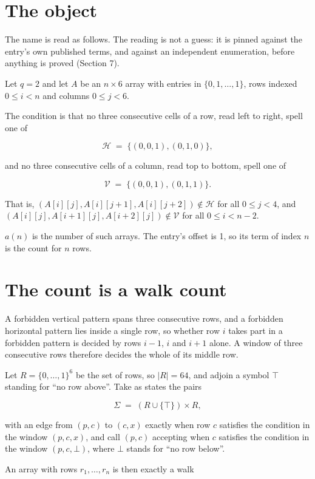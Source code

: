 \documentclass[11pt]{article}
\theoremstyle{definition}
\begin{document}
\section{The object}

The name is read as follows. The reading is not a guess: it is pinned against the entry's own published terms, and against an independent enumeration, before anything is proved (Section 7).

Let $q = 2$ and let $A$ be an $n \times 6$ array with entries in $\{0,1,\dots,1\}$, rows indexed $0 \le i < n$ and columns $0 \le j < 6$.

The condition is that no three consecutive cells of a row, read left to right, spell one of

\[\mathcal{H} \;=\; \{(0,0,1), (0,1,0)\},\]

and no three consecutive cells of a column, read top to bottom, spell one of

\[\mathcal{V} \;=\; \{(0,0,1), (0,1,1)\}.\]

That is, $(A[i][j],A[i][j{+}1],A[i][j{+}2]) \notin \mathcal{H}$ for all $0 \le j < 4$, and $(A[i][j],A[i{+}1][j],A[i{+}2][j]) \notin \mathcal{V}$ for all $0 \le i < n-2$.

$a(n)$ is the number of such arrays. The entry's offset is 1, so its term of index $n$ is the count for $n$ rows.

\section{The count is a walk count}

A forbidden vertical pattern spans three consecutive rows, and a forbidden horizontal pattern lies inside a single row, so whether row $i$ takes part in a forbidden pattern is decided by rows $i-1$, $i$ and $i+1$ alone. A window of three consecutive rows therefore decides the whole of its middle row.

Let $R = \{0,\dots,1\}^{6}$ be the set of rows, so $|R| = 64$, and adjoin a symbol $\top$ standing for ``no row above''. Take as states the pairs

\[\Sigma \;=\; (R \cup \{\top\}) \times R,\]

with an edge from $(p,c)$ to $(c,x)$ exactly when row $c$ satisfies the condition in the window $(p,c,x)$, and call $(p,c)$ accepting when $c$ satisfies the condition in the window $(p,c,\bot)$, where $\bot$ stands for ``no row below''.

An array with rows $r_1,\dots,r_n$ is then exactly a walk
\end{document}
